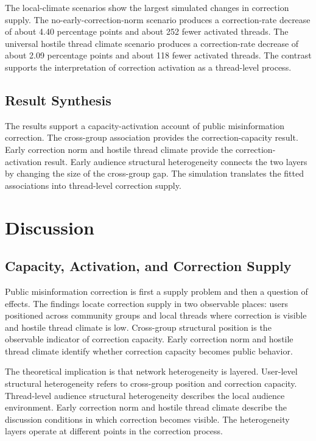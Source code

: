 \documentclass[namedate,unnumsec,webpdf,contemporary,large]{oup-authoring-template}
\begin{document}
The local-climate scenarios show the largest simulated changes in correction supply. The no-early-correction-norm scenario produces a correction-rate decrease of about 4.40 percentage points and about 252 fewer activated threads. The universal hostile thread climate scenario produces a correction-rate decrease of about 2.09 percentage points and about 118 fewer activated threads. The contrast supports the interpretation of correction activation as a thread-level process.

\subsection{Result Synthesis}


The results support a capacity-activation account of public misinformation correction. The cross-group association provides the correction-capacity result. Early correction norm and hostile thread climate provide the correction-activation result. Early audience structural heterogeneity connects the two layers by changing the size of the cross-group gap. The simulation translates the fitted associations into thread-level correction supply.

\section{Discussion}

\subsection{Capacity, Activation, and Correction Supply}


Public misinformation correction is first a supply problem and then a question of effects. The findings locate correction supply in two observable places: users positioned across community groups and local threads where correction is visible and hostile thread climate is low. Cross-group structural position is the observable indicator of correction capacity. Early correction norm and hostile thread climate identify whether correction capacity becomes public behavior.

The theoretical implication is that network heterogeneity is layered. User-level structural heterogeneity refers to cross-group position and correction capacity. Thread-level audience structural heterogeneity describes the local audience environment. Early correction norm and hostile thread climate describe the discussion conditions in which correction becomes visible. The heterogeneity layers operate at different points in the correction process.
\end{document}

